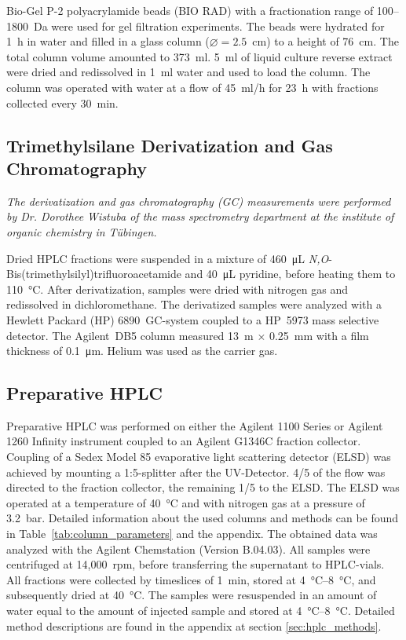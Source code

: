 Bio-Gel P-2 polyacrylamide beads (BIO RAD) with a fractionation range of 100--1800~Da were used for gel filtration experiments.
The beads were hydrated for 1~h in water and filled in a glass column ($\varnothing=2.5$~cm) to a height of 76~cm.
The total column volume amounted to 373~ml.
5~ml of liquid culture reverse extract were dried and redissolved in 1~ml water and used to load the column.
The column was operated with water at a flow of 45~ml/h for 23~h with fractions collected every 30~min.


\subsection{Trimethylsilane Derivatization and Gas Chromatography} %
\label{sub:trimethylsilane_derivatization_and_gas_chromatography}

\emph{The derivatization and gas chromatography (GC) measurements were performed by Dr. Dorothee Wistuba of the mass spectrometry department at the institute of organic chemistry in Tübingen.}

Dried HPLC fractions were suspended in a mixture of \SI{460}{\micro\liter} \emph{N,O}-Bis(trimethylsilyl)\-trifluoro\-acetamide and \SI{40}{\micro\liter} pyridine, before heating them to \SI{110}{\celsius}. After derivatization, samples were dried with nitrogen gas and redissolved in dichloromethane.
The derivatized samples were analyzed with a Hewlett Packard (HP) 6890~GC-system coupled to a HP~5973 mass selective detector. The Agilent~DB5 column measured 13~m $\times$ 0.25~mm with a film thickness of \SI{0.1}{\micro\meter}.
Helium was used as the carrier gas.

\subsection{Preparative HPLC} %
\label{sub:preparative_hplc}

Preparative HPLC was performed on either the Agilent 1100 Series or Agilent 1260 Infinity instrument coupled to an Agilent G1346C fraction collector.
Coupling of a Sedex Model 85 evaporative light scattering detector (ELSD) was achieved by mounting a 1:5-splitter after the UV-Detector.
4/5 of the flow was directed to the fraction collector, the remaining 1/5 to the ELSD.
The ELSD was operated at a temperature of \SI{40}{\celsius} and with nitrogen gas at a pressure of \SI{3.2}{\bar}.
Detailed information about the used columns and methods can be found in Table~\ref{tab:column_parameters} and the appendix.
The obtained data was analyzed with the Agilent Chemstation (Version B.04.03).
All samples were centrifuged at 14,000~rpm, before transferring the supernatant to HPLC-vials.
All fractions were collected by timeslices of \SI{1}{\minute}, stored at \SIrange{4}{8}{\celsius}, and subsequently dried at \SI{40}{\celsius}.
The samples were resuspended in an amount of water equal to the amount of injected sample and stored at \SIrange{4}{8}{\celsius}.
Detailed method descriptions are found in the appendix at section \ref{sec:hplc_methods}.

